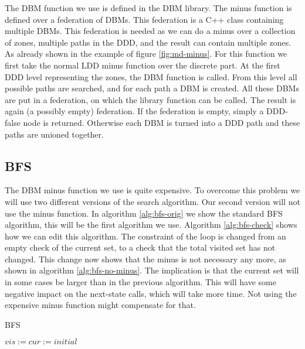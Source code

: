 The DBM function we use is defined in the \uppaal{} DBM library. The minus function is defined over a federation of DBMs. This federation is a C++ class containing multiple DBMs. This federation is needed as we can do a minus over a collection of zones, multiple paths in the DDD, and the result can contain multiple zones. As already shown in the example of figure \ref{fig:md-minus}. For this function we first take the normal LDD minus function over the discrete part. At the first DDD level representing the zones, the DBM function is called. From this level all possible paths are searched, and for each path a DBM is created. All these DBMs are put in a federation, on which the library function can be called. The result is again (a possibly empty) federation. If the federation is empty, simply a DDD-false node is returned. Otherwise each DBM is turned into a DDD path and these paths are unioned together.

\subsection{BFS}
The DBM minus function we use is quite expensive. To overcome this problem we will use two different versions of the search algorithm. Our second version will not use the minus function. In algorithm \ref{alg:bfs-orig} we show the standard BFS algorithm, this will be the first algorithm we use. Algorithm \ref{alg:bfs-check} shows how we can edit this algorithm. The constraint of the loop is changed from an empty check of the current set, to a check that the total visited set has not changed. This change now shows that the minus is not necessary any more, as shown in algorithm \ref{alg:bfs-no-minus}. The implication is that the current set will in some cases be larger than in the previous algorithm. This will have some negative impact on the next-state calls, which will take more time. Not using the expensive minus function might compensate for that.

\begin{algorithm}
\caption{BFS}\label{alg:bfs-orig}
\begin{algorithmic}[1]
	\State $vis := cur := initial$
	\EndWhile
	
\EndProcedure	
\end{algorithmic}
\end{algorithm}

